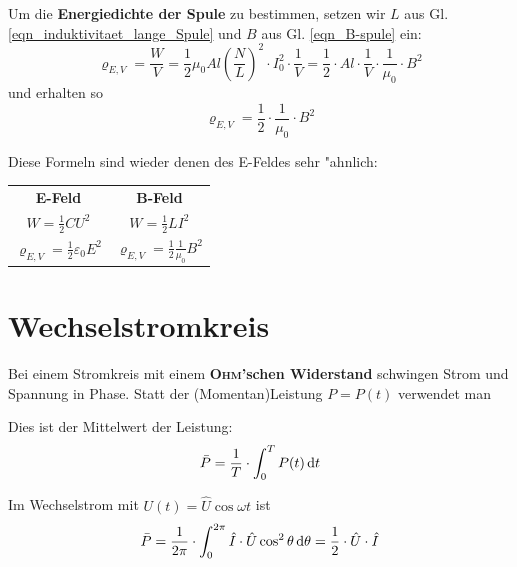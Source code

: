 Um die \textbf{Energiedichte der
  Spule} zu bestimmen, setzen wir $L$ aus
Gl. \eqref{eqn_induktivitaet_lange_Spule} und $B$ aus
Gl. \eqref{eqn_B-spule} ein:
\begin{equation*}
   \label{eq:341}
   \varrho_{E,V} = \frac{W}{V} = \frac{1}{2} \mu_0 A l
     \left(\frac{N}{L}\right)^2 \cdot I_0^2 \cdot \frac{1}{V} =
   \frac{1}{2} \cdot Al \cdot \frac{1}{V} \cdot \frac{1}{\mu_0} \cdot B^2
\end{equation*}
und erhalten so
\begin{equation}
   \label{eq:344}
   \varrho_{E,V} = \frac{1}{2} \cdot \frac{1}{\mu_0} \cdot B^2
\end{equation}




\bigskip
Diese Formeln sind wieder denen des E-Feldes sehr "ahnlich:
\begin{tabular}[c]{c c}
   \textbf{E-Feld} & \textbf{B-Feld} \\
$W = \frac{1}{2} C U^2$ & $ W = \frac{1}{2} L I^2$\\
$\varrho_{E,V} = \frac{1}{2} \varepsilon_0 E^2$ & $\varrho_{E,V} =
\frac{1}{2} \frac{1}{\mu_0} B^2$
\end{tabular}















\section{Wechselstromkreis}
\label{kap_wechselstromkreis}

Bei einem Stromkreis mit einem \textbf{\textsc{Ohm}'schen Widerstand}
schwingen Strom und Spannung in Phase. Statt der (Momentan)Leistung $P
= P(t)$ verwendet man
\begin{Def}
    Dies ist der Mittelwert
   der Leistung:
   \begin{equation}
      \label{eq:345}
      \bar P = \frac{1}{T} \cdot \int_0^T P(t) \, \mathrm{d} t
   \end{equation}
\end{Def}
Im Wechselstrom mit $U(t) = \hat U \cos \omega t$ ist
\begin{equation}
   \label{eq:346}
   \bar P = \frac{1}{2\pi} \cdot \int_0^{2\pi} {\hat I} \cdot \hat U \cos^2
   \theta \, \mathrm{d} \theta = \frac{1}{2} \cdot \hat U \cdot \hat I
\end{equation}

